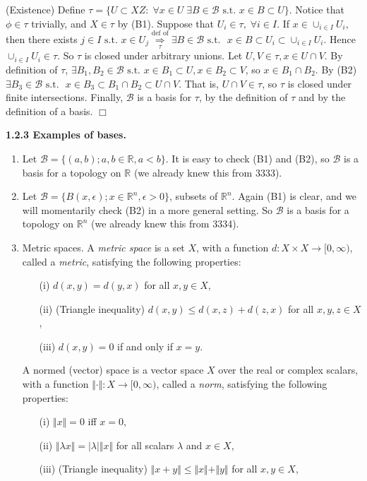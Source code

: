 \documentclass[12pt]{article}
\newcommand{\st}[0]{ \textrm{ s.t. } }
\newcommand{\rimply}[0] { \Rightarrow }
\newcommand{\reals}[0] { \mathbb{R}}
\newcommand{\eps}[0] {  \epsilon }
\newcommand{\B}[0] { \mathcal{B} }
\begin{document}
\begin{flushleft}
\begin{flushleft}
(Existence) Define $\tau = \{ U \subset X Z: \; \forall x \in U \; \exists B \in \B \st x \in B \subset U \}$.
Notice that  $\phi \in \tau$ trivially, and $X \in \tau$ by (B1).
Suppose that $U_i \in \tau, \; \forall i \in I$.  If $x \in \cup_{i \in I} U_i$,
then there exists $j \in I \st x \in U_j  \underset{\tau}{\overset{\textrm{def of} }{\rimply}} \exists B \in \B \st$ $ x \in B \subset U_i \subset \cup_{i \in I} U_i$.  Hence  $\cup_{i \in I} U_i \in \tau$.
So $\tau$ is closed under arbitrary unions. Let $U, V \in \tau, x \in U \cap V$.
By definition of $\tau$, $\exists B_1, B_2 \in \B \st x \in B_1 \subset U, x \in B_2 \subset V$, so $x \in B_1 \cap B_2$.  By (B2) $\exists B_3 \in \B \st$ $ x \in B_3 \subset B_1 \cap B_2 \subset U \cap V$.
That is, $U \cap V \in \tau$, so $\tau$ is closed under finite intersections.
Finally, $\B$ is a basis for $\tau$, by the definition of $\tau$ and by the definition of a basis. $\Box$\end{flushleft}\end{flushleft}\begin{flushleft}
{ \bf 1.2.3  Examples of bases.  }\begin{enumerate}
\item
                Let $\B = \{ (a,b); a,b \in \reals, a<b \}$.  It is
easy to check (B1) and (B2), so $\B$ is a basis for a topology
on $\reals$ (we already knew this from 3333).
  \item
                Let $\B = \{ B(x, \eps); x \in \reals^n, \eps>0 \}$, subsets
of $\reals^n$.  Again (B1) is clear, and we will momentarily
 check (B2) in a more general setting.  So $\B$ is a basis for a topology
on $\reals^n$  (we already knew this from 3334).    \item
                Metric spaces.  A {\em metric space} is a set $X$,
with a function $d : X \times X \rightarrow [0,\infty)$,
 called a {\em metric}, satisfying the following properties:
\begin{itemize}
\item [(i)]  $d(x,y) = d(y,x)$ for all $x, y \in X$,
\item [(ii)] (Triangle inequality) $d(x,y) \leq d(x,z) + d(z,x)$
 for all $x, y, z  \in X$,
\item [(iii)]  $d(x,y) = 0$ if and only if $x = y$.
\end{itemize}

A normed (vector) space is a vector space $X$ over the real or complex scalars,
with a
function
$\Vert \cdot \Vert : X \rightarrow [0,\infty)$,
called a {\em norm},  satisfying the following properties:
\begin{itemize}
\item [(i)]  $\Vert x \Vert = 0$ iff $x = 0$,
\item [(ii)] $ \Vert \lambda x \Vert = |\lambda | \Vert  x \Vert$ for
all scalars $\lambda$ and $x \in X$,
\item [(iii)]  (Triangle inequality) $\Vert x + y \Vert \leq \Vert x \Vert + \Vert y \Vert$
for all $x, y \in X$,
\end{itemize}


\end{enumerate}
\end{flushleft}
\end{document}
